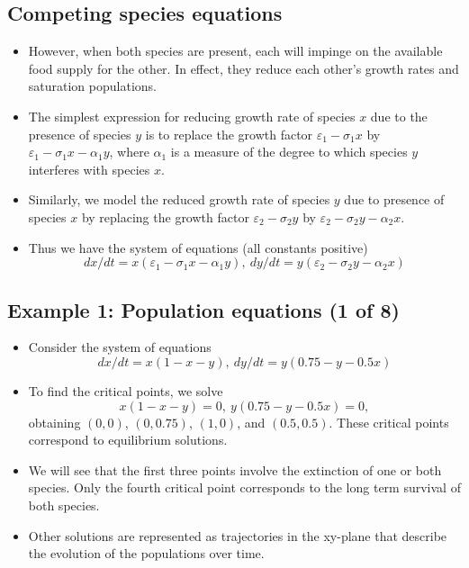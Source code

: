\documentclass[11pt,a4paper]{article}
\begin{document}
	\subsection*{Competing species equations}
	\begin{itemize}
		\item However, when both species are present, each will impinge on the available food supply for the other. In effect, they reduce each other’s growth rates and saturation populations.
		\item The simplest expression for reducing growth rate of species $x$ due to the presence of species $y$ is to replace the growth factor $\varepsilon_1 - \sigma_1 x$ by $\varepsilon_1 - \sigma_1 x - \alpha_1 y$, where $\alpha_1$ is a measure of the degree to which species $y$ interferes with species $x$.
		\item Similarly, we model the reduced growth rate of species $y$ due to presence of species $x$ by replacing the growth factor $\varepsilon_2 - \sigma_2 y$ by $\varepsilon_2 - \sigma_2 y - \alpha_2 x$.
		\item Thus we have the system of equations (all constants positive)
		$$
		dx/dt = x(\varepsilon_1 - \sigma_1 x - \alpha_1 y),\ dy/dt = y(\varepsilon_2 - \sigma_2 y - \alpha_2 x)
		$$
	\end{itemize}
	\subsection*{Example 1: Population equations (1 of 8)}
	\begin{itemize}
		\item Consider the system of equations
		$$
		dx/dt = x(1-x-y),\ dy/dt = y(0.75 - y- 0.5x)
		$$
		\item To find the critical points, we solve
		$$
		x(1-x-y) = 0,\ y(0.75 - y- 0.5x) = 0,
		$$
		obtaining $(0,0)$, $(0,0.75)$, $(1,0)$, and $(0.5,0.5)$. These critical points correspond to equilibrium solutions.
		\item We will see that the first three points involve the extinction of one or both species. Only the fourth critical point corresponds to the long term survival of both species.
		\item Other solutions are represented as trajectories in the xy-plane that describe the evolution of the populations over time.
	\end{itemize}
\end{document}

